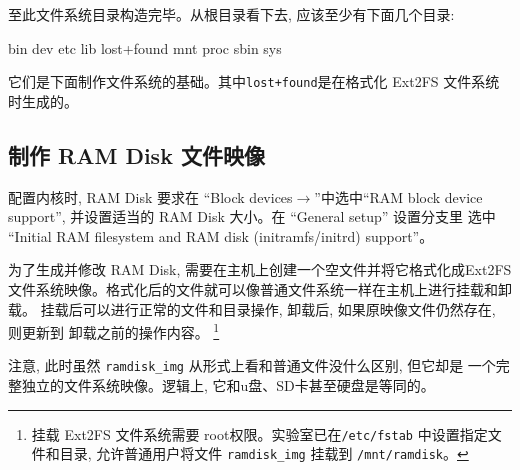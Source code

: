 
	至此文件系统目录构造完毕。从根目录看下去, 应该至少有下面几个目录:
\begin{blockcode}
	bin     dev     etc     lib     lost+found
	mnt     proc    sbin    sys
\end{blockcode}
    它们是下面制作文件系统的基础。其中\verb|lost+found|是在格式化 Ext2FS
    文件系统时生成的。

\subsection{制作 RAM Disk 文件映像}
配置内核时, RAM Disk 要求在 ``Block devices$\to$''中选中``RAM block
device support'', 并设置适当的 RAM Disk 大小。在 ``General setup'' 设置分支里
选中 ``Initial RAM filesystem and RAM disk (initramfs/initrd) support''。

为了生成并修改 RAM Disk, 需要在主机上创建一个空文件并将它格式化成Ext2FS
文件系统映像。格式化后的文件就可以像普通文件系统一样在主机上进行挂载和卸载。
挂载后可以进行正常的文件和目录操作, 卸载后, 如果原映像文件仍然存在, 则更新到
卸载之前的操作内容。
\footnote{挂载 Ext2FS 文件系统需要 root权限。实验室已在{\tt /etc/fstab}
中设置指定文件和目录, 允许普通用户将文件 {\tt ramdisk\_img} 挂载到
{\tt /mnt/ramdisk}。}


注意, 此时虽然 \verb|ramdisk_img| 从形式上看和普通文件没什么区别, 但它却是
一个完整独立的文件系统映像。逻辑上, 它和u盘、SD卡甚至硬盘是等同的。


